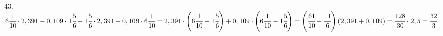 43. $6\cfrac{1}{10}\cdot2,391-0,109\cdot1\cfrac{5}{6}-1\cfrac{5}{6}\cdot2,391+0,109\cdot6\cfrac{1}{10}=
2,391\cdot\left(6\cfrac{1}{10}-1\cfrac{5}{6}\right)+0,109\cdot\left(6\cfrac{1}{10}-1\cfrac{5}{6}\right)=
\left(\cfrac{61}{10}-\cfrac{11}{6}\right)(2,391+0,109)=\cfrac{128}{30}\cdot2,5=\cfrac{32}{3}.$\\
